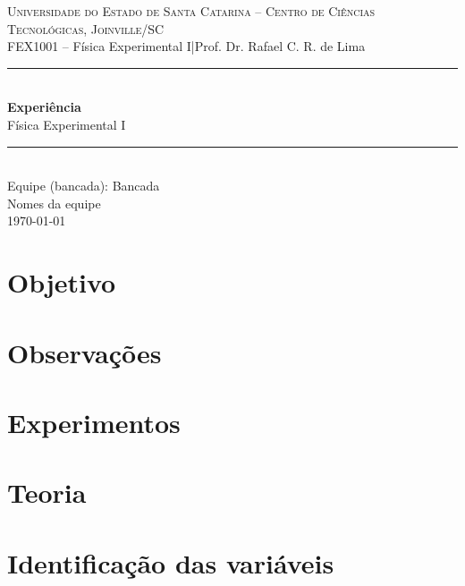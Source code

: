 \documentclass[a4paper,11pt]{article}
\newcommand{\experimento}{Experiência}
\newcommand{\subtitulo}{Física Experimental I}
\newcommand{\equipe}{Bancada}
\newcommand{\integrantes}{Nomes da equipe}
\newcommand{\datarelatorio}{\today}
\newcommand{\disciplina}{FEX1001 -- Física Experimental I}
\newcommand{\professor}{Prof. Dr. Rafael C. R. de Lima}
\newcommand{\instituicao}{Universidade do Estado de Santa Catarina --
Centro de Ciências Tecnológicas, Joinville/SC}
\begin{document}
\begin{center}
  {\large\scshape \instituicao}\\[2pt]
  {\small \disciplina \quad|\quad \professor}\\[14pt]
  \rule{\linewidth}{0.5pt}\\[10pt]
  {\LARGE\bfseries \experimento}\\[4pt]
  {\large \subtitulo}\\[10pt]
  \rule{\linewidth}{0.5pt}\\[10pt]
  {\normalsize Equipe (bancada): \equipe}\\[2pt]
  {\normalsize \integrantes}\\[2pt]
  {\small \datarelatorio}
\end{center}

\vspace{6pt}

\section{Objetivo}


\section{Observações}


\section{Experimentos}




\section{Teoria}


\section{Identificação das variáveis}

\end{document}

